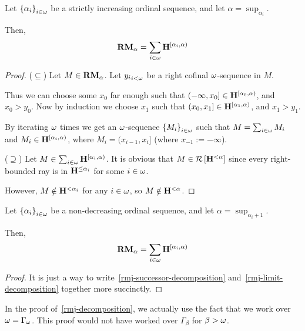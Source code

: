 \begin{lemma}\label{rmj-limit-decomposition}
  Let $\left\{ {\alpha_i} \right\}_{i \in \omega}$ be a strictly
  increasing ordinal sequence, and let $\alpha = \sup_{\alpha_i}$.

  Then,
  \[
    \mathbf{RM}_{\alpha} = \sum_{i \in \omega}{\mathbf{H}_{}^{[\alpha_i, \alpha)}}
  \]
\end{lemma}

\begin{proof}
  ($\subseteq$) Let $M \in \mathbf{RM}_{\alpha}$.
  Let ${y_i}_{i < \omega}$ be a right cofinal $\omega$-sequence in $M$.

  Thus we can choose some $x_0$ far enough such that $(-\infty, x_0] \in \mathbf{H}_{}^{[\alpha_0, \alpha)}$,
          and $x_0 > y_0$.
          Now by induction we choose $x_1$ such that $(x_0, x_1] \in \mathbf{H}_{}^{[\alpha_1, \alpha)}$,
  and $x_1 > y_1$.

  By iterating $\omega$ times we get an $\omega$-sequence $\left\{ {M_i} \right\}_{i \in \omega}$
  such that $M = \sum_{i \in \omega} M_i$ and $M_i \in \mathbf{H}_{}^{[\alpha_i, \alpha)}$,
          where $M_i = (x_{i-1}, x_i]$ (where $x_{-1} := -\infty$).


  ($\supseteq$) Let $M \in \sum_{i \in \omega}{\mathbf{H}_{}^{[\alpha_i, \alpha)}}$.
  It is obvious that $M \in \mathcal{R} \left[ {{\mathbf{H}_{}^{< \alpha}}} \right]$ since every right-bounded
  ray is in $\mathbf{H}_{}^{\le \alpha_i}$ for some $i \in \omega$.

  However, $M \notin \mathbf{H}_{}^{< \alpha_i}$ for any $i \in \omega$, so $M \notin \mathbf{H}_{}^{< \alpha}$.


\end{proof}

\begin{lemma}\label{rmj-decomposition}
  Let $\left\{ {\alpha_i} \right\}_{i \in \omega}$ be a non-decreasing ordinal sequence,
  and let $\alpha = \sup_{\alpha_i + 1}$.

  Then,
  \[
    \mathbf{RM}_{\alpha} = \sum_{i \in \omega}{\mathbf{H}_{}^{[\alpha_i, \alpha)}}
  \]
\end{lemma}

\begin{proof}
  It is just a way to
  write~\cref{rmj-successor-decomposition}
  and~\cref{rmj-limit-decomposition}
  together more succinctly.
\end{proof}

\begin{note}
  In the proof of~\cref{rmj-decomposition}, we actually use the fact that
  we work over $\omega = \Gamma_{\omega}$. This proof would not have worked over $\Gamma_{\beta}$
  for $\beta > \omega$.
\end{note}
